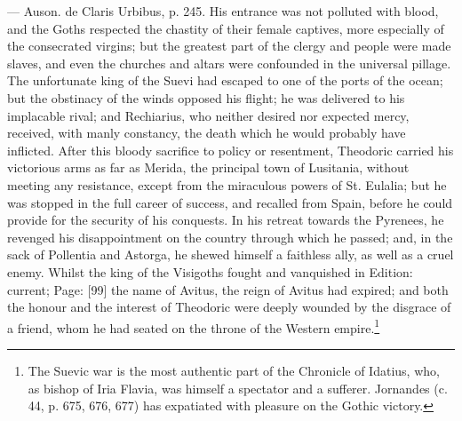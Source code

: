 {\texthebrew{—} Auson. de Claris Urbibus, p. 245.} His entrance was not polluted with blood, and the Goths respected the chastity of their female captives, more especially of the consecrated virgins; but the greatest part of the clergy and people were made slaves, and even the churches and altars were confounded in the universal pillage. The unfortunate king of the Suevi had escaped to one of the ports of the ocean; but the obstinacy of the winds opposed his flight; he was delivered to his implacable rival; and Rechiarius, who neither desired nor expected mercy, received, with manly constancy, the death which he would probably have inflicted. After this bloody sacrifice to policy or resentment, Theodoric carried his victorious arms as far as Merida, the principal town of Lusitania, without meeting any resistance, except from the miraculous powers of St. Eulalia; but he was stopped in the full career of success, and recalled from Spain, before he could provide for the security of his conquests. In his retreat towards the Pyrenees, he revenged his disappointment on the country through which he passed; and, in the sack of Pollentia and Astorga, he shewed himself a faithless ally, as well as a cruel enemy. Whilst the king of the Visigoths fought and vanquished in Edition: current; Page: [99] the name of Avitus, the reign of Avitus had expired; and both the honour and the interest of Theodoric were deeply wounded by the disgrace of a friend, whom he had seated on the throne of the Western empire.\footnote{The Suevic war is the most authentic part of the Chronicle of Idatius, who, as bishop of Iria Flavia, was himself a spectator and a sufferer. Jornandes (c. 44, p. 675, 676, 677) has expatiated with pleasure on the Gothic victory.}

